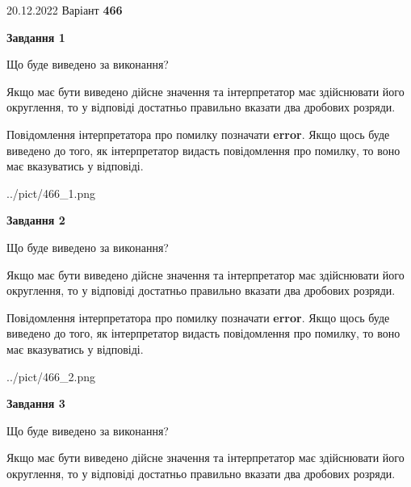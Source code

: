 \documentclass[12pt, ukrainian]{article}
\begin{document}
{20.12.2022 Варіант \No \textbf { 466 }\par}
{
\begin {Large}

{\begin {center}\textbf{Завдання 1}\end {center}}\par
Що буде виведено за виконання? \par

Якщо має бути виведено дійсне значення та інтерпретатор має здійснювати його округлення, 
то у відповіді достатньо правильно вказати два дробових розряди.

Повідомлення інтерпретатора про помилку позначати \textbf{error}.
Якщо щось буде виведено до того, як інтерпретатор видасть повідомлення про помилку, 
то воно має вказуватись у відповіді. \par

\begin{center}
	{../pict/466_1.png}
\end{center}
\newpage

{\begin {center}\textbf{Завдання 2}\end {center}}\par
Що буде виведено за виконання? \par

Якщо має бути виведено дійсне значення та інтерпретатор має здійснювати його округлення, 
то у відповіді достатньо правильно вказати два дробових розряди.

Повідомлення інтерпретатора про помилку позначати \textbf{error}.
Якщо щось буде виведено до того, як інтерпретатор видасть повідомлення про помилку, 
то воно має вказуватись у відповіді. \par

\begin{center}
	{../pict/466_2.png}
\end{center}
\newpage

{\begin {center}\textbf{Завдання 3}\end {center}}\par
Що буде виведено за виконання? \par

Якщо має бути виведено дійсне значення та інтерпретатор має здійснювати його округлення, 
то у відповіді достатньо правильно вказати два дробових розряди.


\end{Large}}
\end{document}
